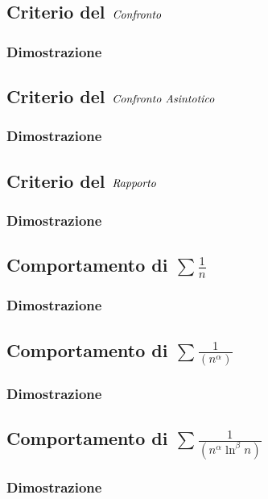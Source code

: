 \documentclass[11pt, a4paper]{article}
\begin{document}
\subsection{Criterio del $\emph{Confronto}$}
\subsubsection*{Dimostrazione}


\subsection{Criterio del $\emph{Confronto Asintotico}$}
\subsubsection*{Dimostrazione}


\subsection{Criterio del $\emph{Rapporto}$}
\subsubsection*{Dimostrazione}


\subsection{Comportamento di $\sum\frac{1}{n}$}
\subsubsection*{Dimostrazione}


\subsection{Comportamento di $\sum\frac{1}{(n^\alpha)}$}
\subsubsection*{Dimostrazione}


\subsection{Comportamento di $\sum\frac{1}{(n^\alpha\ln^\beta n)}$}
\subsubsection*{Dimostrazione}
\end{document}
